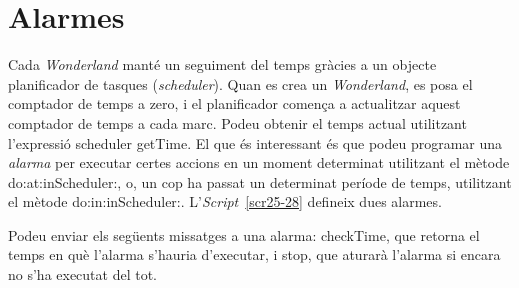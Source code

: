 \section{Alarmes}
Cada \emph{Wonderland} manté un seguiment del temps gràcies a un objecte planificador de tasques (\emph{scheduler}). Quan es crea un \emph{Wonderland}, es posa el comptador de temps a zero, i el planificador comença a actualitzar aquest comptador de temps a cada marc. Podeu obtenir el temps actual utilitzant l'expressió \textsf{scheduler getTime}. El que és interessant és que podeu programar una \emph{alarma} per executar certes accions en un moment determinat utilitzant el mètode \textsf{do:at:inScheduler:}, o, un cop ha passat un determinat període de temps, utilitzant el mètode \textsf{do:in:inScheduler:}. L'\emph{Script}~\ref{scr25-28} defineix dues alarmes.  


Podeu enviar els següents missatges a una alarma: \textsf{checkTime}, que retorna el temps en què l'alarma s'hauria d'executar, i \textsf{stop}, que aturarà l'alarma si encara no s'ha executat del tot. 


